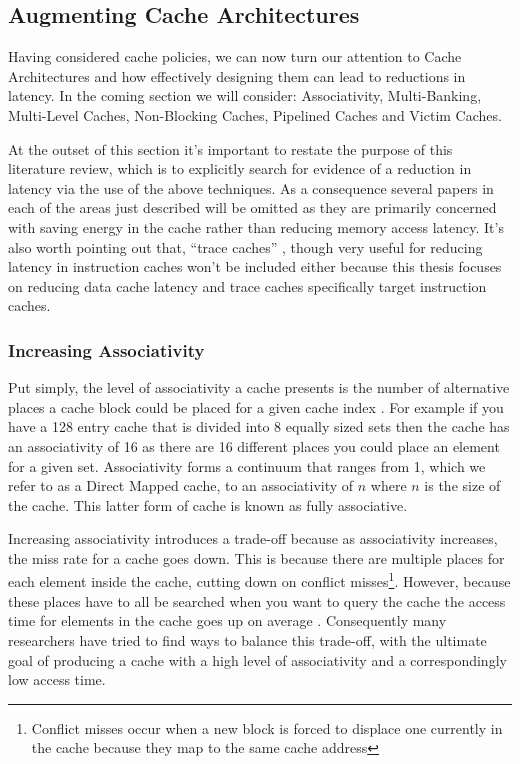 \subsection{Augmenting Cache Architectures}
Having considered cache policies, we can now turn our attention to Cache Architectures and how effectively designing them can lead to reductions in latency. In the coming section we will consider: Associativity, Multi-Banking, Multi-Level Caches, Non-Blocking Caches, Pipelined Caches and Victim Caches. 

At the outset of this section it's important to restate the purpose of this literature review, which is to explicitly search for evidence of a reduction in latency via the use of the above techniques. As a consequence several papers in each of the areas just described will be omitted as they are primarily concerned with saving energy in the cache rather than reducing memory access latency. It's also worth pointing out that, ``trace caches''\cite{rotenbergTraceCacheMicroarchitecture1999, ramirezTraceCacheRedundancy2000} , though very useful for reducing latency in instruction caches won't be included either because this thesis focuses on reducing data cache latency and trace caches specifically target instruction caches.

\subsubsection{Increasing Associativity}

Put simply, the level of associativity a cache presents is the number of alternative places a cache block could be placed for a given cache index \cite{pachecoParallelHardwareParallel2011}. For example if you have a 128 entry cache that is divided into 8 equally sized sets then the cache has an associativity of 16 as there are 16 different places you could place an element for a given set. Associativity forms a continuum that ranges from 1, which we refer to as a Direct Mapped cache, to an associativity of $n$ where $n$ is the size of the cache. This latter form of cache is known as fully associative. 

Increasing associativity introduces a trade-off because as associativity increases, the miss rate for a cache goes down. This is because there are multiple places for each element inside the cache, cutting down on conflict misses\footnote{Conflict misses occur when a new block is forced to displace one currently in the cache because they map to the same cache address}. However, because these places have to all be searched when you want to query the cache the access time for elements in the cache goes up on average \cite{kesslerInexpensiveImplementationsSetAssociativity1989}. Consequently many researchers have tried to find ways to balance this trade-off, with the ultimate goal of producing a cache with a high level of associativity and a correspondingly low access time. 

